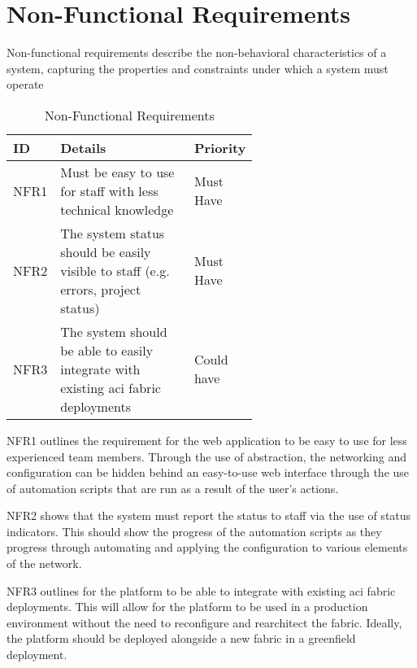 \section{Non-Functional Requirements}
Non-functional requirements describe the non-behavioral characteristics of a system, capturing the properties and constraints under which a system must operate \citep{12} 
\begin{center}
    \begin{table}[H]
        \begin{tabular}{l p{0.6\linewidth} l}
            \hline
            \textbf{ID}             & \textbf{Details}
                                    & \textbf{Priority}
            \\ \hline
            NFR1                    & Must be easy to use for staff with less technical
            knowledge
                                    & Must Have
            \\ \hline
            NFR2                    & The system status should be easily visible to staff (e.g.
            errors, project status) & Must Have                                                                                       \\ \hline
            NFR3                    & The system should be able to easily integrate with existing \gls{aci} fabric deployments & Could have
        \end{tabular}
        \caption{Non-Functional Requirements}
        \label{requirements:non-functional}
    \end{table}
\end{center}

NFR1 outlines the requirement for the web application to be easy to use for less experienced team members. Through the use of abstraction, the networking and configuration can be hidden behind an easy-to-use web interface through the use of automation scripts that are run as a result of the user's actions.

NFR2 shows that the system must report the status to staff via the use of status indicators. This should show the progress of the automation scripts as they progress through automating and applying the configuration to various elements of the network.

NFR3 outlines for the platform to be able to integrate with existing \gls{aci} fabric deployments. This will allow for the platform to be used in a production environment without the need to reconfigure and rearchitect the fabric. Ideally, the platform should be deployed alongside a new fabric in a greenfield deployment.